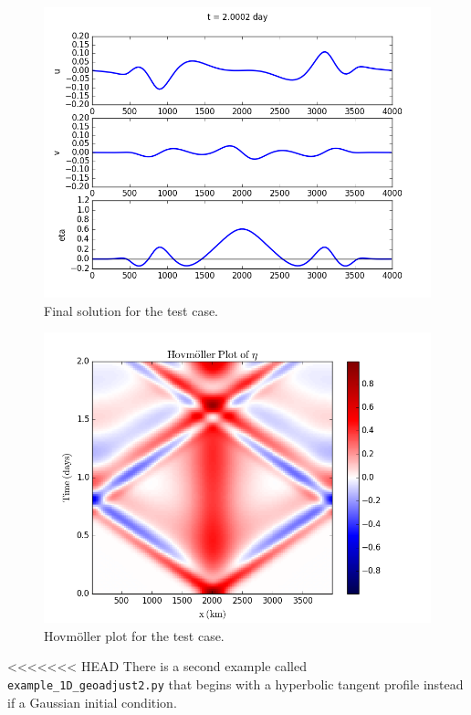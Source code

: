 \documentclass[11pt]{article}
\begin{document}
\begin{figure}[h]
\begin{center}
\includegraphics[width=12cm]{Figures/ex1_fig1.png}
\caption{Final solution for the test case.}
\end{center}
\end{figure}

\begin{figure}[h]
\begin{center}
\includegraphics[width=12cm]{Figures/ex1_fig2.png}
\caption{Hovm\"oller plot for the test case.}
\end{center}
\end{figure}

<<<<<<< HEAD
There is a second example called {\tt example\_1D\_geoadjust2.py} that begins with a hyperbolic tangent profile instead if a Gaussian initial condition.
\end{document}
